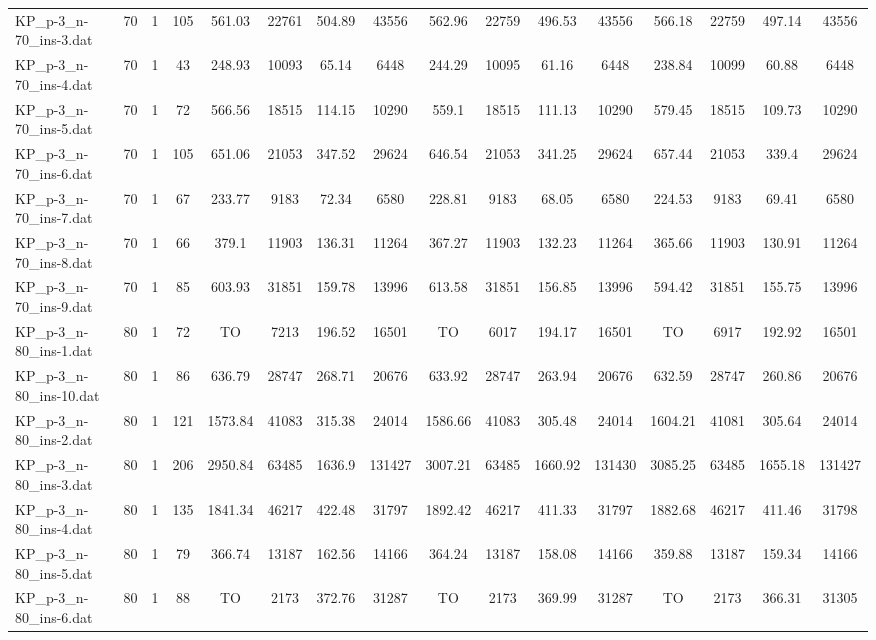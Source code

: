 \begin{sidewaystable}[!ht]
{\begin{tabular}{lccccccccccccccc}
KP\_p-3\_n-70\_ins-3.dat & 70 & 1 & 105 & 561.03 & 22761 & 504.89 & 43556 & 562.96 & 22759 & 496.53 & 43556 & 566.18 & 22759 & 497.14 & 43556 \\
KP\_p-3\_n-70\_ins-4.dat & 70 & 1 & 43 & 248.93 & 10093 & 65.14 & 6448 & 244.29 & 10095 & 61.16 & 6448 & 238.84 & 10099 & 60.88 & 6448 \\
KP\_p-3\_n-70\_ins-5.dat & 70 & 1 & 72 & 566.56 & 18515 & 114.15 & 10290 & 559.1 & 18515 & 111.13 & 10290 & 579.45 & 18515 & 109.73 & 10290 \\
KP\_p-3\_n-70\_ins-6.dat & 70 & 1 & 105 & 651.06 & 21053 & 347.52 & 29624 & 646.54 & 21053 & 341.25 & 29624 & 657.44 & 21053 &  \textcolor{blue2}{339.4} & 29624 \\
KP\_p-3\_n-70\_ins-7.dat & 70 & 1 & 67 & 233.77 & 9183 & 72.34 & 6580 & 228.81 & 9183 &  \textcolor{blue2}{68.05} & 6580 & 224.53 & 9183 & 69.41 & 6580 \\
KP\_p-3\_n-70\_ins-8.dat & 70 & 1 & 66 & 379.1 & 11903 & 136.31 & 11264 & 367.27 & 11903 & 132.23 & 11264 & 365.66 & 11903 & 130.91 & 11264 \\
KP\_p-3\_n-70\_ins-9.dat & 70 & 1 & 85 & 603.93 & 31851 & 159.78 & 13996 & 613.58 & 31851 & 156.85 & 13996 & 594.42 & 31851 & 155.75 & 13996 \\
KP\_p-3\_n-80\_ins-1.dat & 80 & 1 & 72 &  TO & 7213 & 196.52 & 16501 &  TO & 6017 & 194.17 & 16501 &  TO & 6917 & 192.92 & 16501 \\
KP\_p-3\_n-80\_ins-10.dat & 80 & 1 & 86 & 636.79 & 28747 & 268.71 & 20676 & 633.92 & 28747 & 263.94 & 20676 & 632.59 & 28747 & 260.86 & 20676 \\
KP\_p-3\_n-80\_ins-2.dat & 80 & 1 & 121 & 1573.84 & 41083 & 315.38 & 24014 & 1586.66 & 41083 &  \textcolor{blue2}{305.48} & 24014 & 1604.21 & 41081 & 305.64 & 24014 \\
KP\_p-3\_n-80\_ins-3.dat & 80 & 1 & 206 & 2950.84 & 63485 &  \textcolor{blue2}{1636.9} & 131427 & 3007.21 & 63485 & 1660.92 & 131430 & 3085.25 & 63485 & 1655.18 & 131427 \\
KP\_p-3\_n-80\_ins-4.dat & 80 & 1 & 135 & 1841.34 & 46217 & 422.48 & 31797 & 1892.42 & 46217 & 411.33 & 31797 & 1882.68 & 46217 & 411.46 & 31798 \\
KP\_p-3\_n-80\_ins-5.dat & 80 & 1 & 79 & 366.74 & 13187 & 162.56 & 14166 & 364.24 & 13187 & 158.08 & 14166 & 359.88 & 13187 & 159.34 & 14166 \\
KP\_p-3\_n-80\_ins-6.dat & 80 & 1 & 88 &  TO & 2173 & 372.76 & 31287 &  TO & 2173 & 369.99 & 31287 &  TO & 2173 &  \textcolor{blue2}{366.31} & 31305 \\

\end{tabular}}
\end{sidewaystable}
